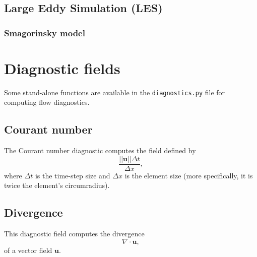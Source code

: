 \documentclass[a4paper,11pt]{report}
\begin{document}
\section{Large Eddy Simulation (LES)}

\subsection{Smagorinsky model}



\chapter{Diagnostic fields}
Some stand-alone functions are available in the \texttt{diagnostics.py} file for computing flow diagnostics.

\section{Courant number}
The Courant number diagnostic computes the field defined by
\begin{equation}
   \frac{||\mathbf{u}||\Delta t}{\Delta x},
\end{equation}
where $\Delta t$ is the time-step size and $\Delta x$ is the element size (more specifically, it is twice the element's circumradius).

\section{Divergence}
This diagnostic field computes the divergence
\begin{equation}
   \nabla\cdot\mathbf{u},
\end{equation}
of a vector field $\mathbf{u}$.



\end{document}
